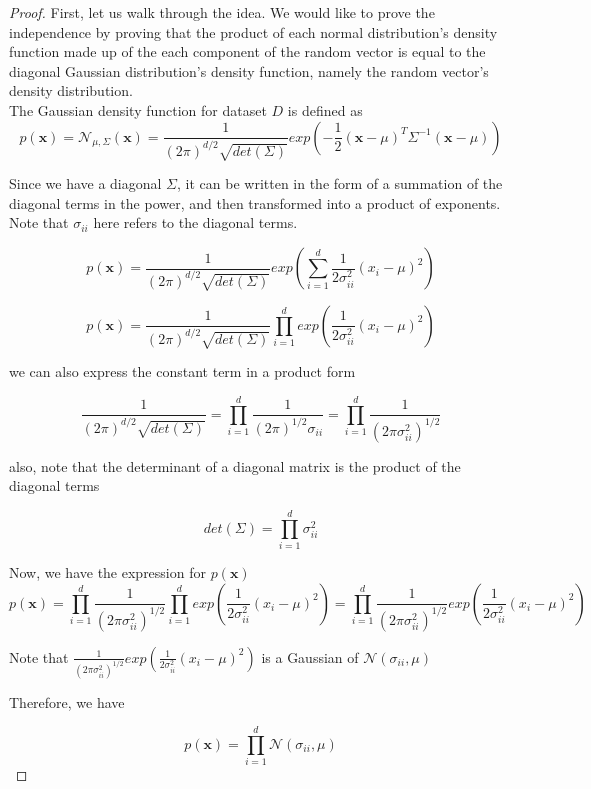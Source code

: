 \documentclass[12pt]{article}
\begin{document}
\begin{proof}
First, let us walk through the idea. We would like to prove the independence by proving that the product of each normal distribution's density function made up of the each component of the random vector is equal to the diagonal Gaussian distribution's density function, namely the random vector's density distribution. \\
The Gaussian density function for dataset $D$ is defined as \\

\begin{equation*}
p(\bm{x}) = \mathcal{N}_{\mu, \Sigma}(\bm{x}) = \frac{1}{(2\pi)^{d/2}\sqrt{det(\Sigma)}} exp(-\frac{1}{2}(\bm{x} - \mu)^T \Sigma^{-1} (\bm{x} - \mu)) 
\end{equation*}

Since we have a diagonal $\Sigma$, it can be written in the form of a summation of the diagonal terms in the power, and then transformed into a product of exponents. Note that $\sigma_{ii}$ here refers to the diagonal terms.

\begin{equation*}
p(\bm{x}) = \frac{1}{(2\pi)^{d/2}\sqrt{det(\Sigma)}} exp(\sum_{i=1}^{d} \frac{1}{2 \sigma_{ii}^2}(x_i - \mu)^2) 
\end{equation*}

\begin{equation*}
p(\bm{x}) = \frac{1}{(2\pi)^{d/2}\sqrt{det(\Sigma)}} \prod_{i=1}^{d} exp (\frac{1}{2 \sigma_{ii}^2}(x_i - \mu)^2)
\end{equation*}

we can also express the constant term in a product form

\begin{equation*}
\frac{1}{(2\pi)^{d/2}\sqrt{det(\Sigma)}}  = \prod_{i=1}^{d} \frac{1}{(2\pi)^{1/2} \sigma_{ii} } =  \prod_{i=1}^{d} \frac{1}{(2\pi \sigma_{ii}^2)^{1/2} }
\end{equation*}

also, note that the determinant of a diagonal matrix is the product of the diagonal terms

\begin{equation*}
det(\Sigma) = \prod_{i=1}^{d} \sigma_{ii}^2
\end{equation*}

Now, we have the expression for $p(\bm{x})$
\begin{equation*}
p(\bm{x}) = \prod_{i=1}^{d} \frac{1}{(2\pi \sigma_{ii}^2)^{1/2} } \prod_{i=1}^{d} exp (\frac{1}{2 \sigma_{ii}^2}(x_i - \mu)^2) = \prod_{i=1}^{d} \frac{1}{(2\pi \sigma_{ii}^2)^{1/2} } exp (\frac{1}{2 \sigma_{ii}^2}(x_i - \mu)^2) 
\end{equation*}

Note that $\frac{1}{(2\pi \sigma_{ii}^2)^{1/2} } exp (\frac{1}{2 \sigma_{ii}^2}(x_i - \mu)^2)$ is a Gaussian of $\mathcal{N}(\sigma_{ii}, \mu)$

Therefore, we have

\begin{equation*}
p(\bm{x}) = \prod_{i =1}^{d} \mathcal{N}(\sigma_{ii}, \mu)
\end{equation*}

\end{proof}
\end{document}
